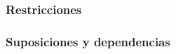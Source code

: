 \documentclass{article}
\begin{document}








        \subsubsection{Restricciones}









        \subsubsection{Suposiciones y dependencias}



\end{document}
